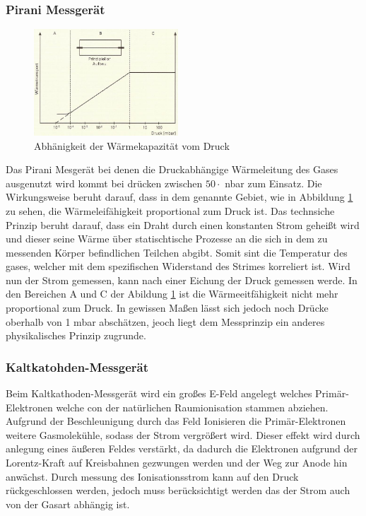 \subsubsection{Pirani Messgerät}
\begin{figure}
  \centering
  \includegraphics[width=0.48\textwidth]{picture/Pirani.JPG}
  \caption{Abhänigkeit der Wärmekapazität vom Druck \cite{??}}
  \label{fig:pirani}
  \vspace{-0.6cm}
\end{figure}
Das Pirani Mesgerät bei denen die Druckabhängige Wärmeleitung des Gases ausgenutzt wird kommt bei drücken zwischen $50 \cdot$ nbar zum Einsatz. Die Wirkungsweise beruht darauf, dass in dem genannte Gebiet, wie in Abbildung \ref{fig:pirani} zu sehen, die Wärmeleifähigkeit proportional zum Druck ist. Das technsiche Prinzip beruht darauf, dass ein Draht durch einen konstanten Strom geheißt wird und dieser seine Wärme über statischtische Prozesse an die sich in dem zu messenden Körper befindlichen Teilchen abgibt. Somit sint die Temperatur des gases, welcher mit dem spezifischen Widerstand des Strimes korreliert ist. Wird nun der Strom gemessen, kann nach einer Eichung der Druck gemessen werde. In den Bereichen A und C der Abildung \ref{fig:pirani} ist die Wärmeeitfähigkeit nicht mehr proportional zum Druck. In gewissen Maßen lässt sich jedoch noch Drücke oberhalb von 1 mbar abschätzen, jeoch liegt dem Messprinzip ein anderes physikalisches Prinzip zugrunde.

\subsubsection{Kaltkatohden-Messgerät}
Beim Kaltkathoden-Messgerät wird ein großes E-Feld angelegt welches Primär-Elektronen welche con der natürlichen Raumionisation stammen abziehen. Aufgrund der Beschleunigung durch das Feld Ionisieren die Primär-Elektronen weitere Gasmolekühle, sodass der Strom vergrößert wird. Dieser effekt wird durch anlegung eines äußeren Feldes verstärkt, da dadurch die Elektronen aufgrund der Lorentz-Kraft auf Kreisbahnen gezwungen werden und der Weg zur Anode hin anwächst. Durch messung des Ionisationsstrom kann auf den Druck rückgeschlossen werden, jedoch muss berücksichtigt werden das der Strom auch von der Gasart abhängig ist.  

